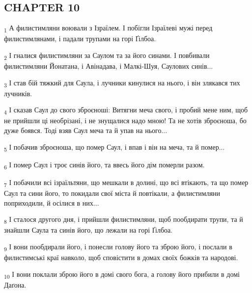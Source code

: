 \subsection{CHAPTER 10}
\begin{tcolorbox}
\textsubscript{1} А филистимляни воювали з Ізраїлем. І побігли Ізраїлеві мужі перед филистимлянами, і падали трупами на горі Ґілбоа.
\end{tcolorbox}
\begin{tcolorbox}
\textsubscript{2} І гналися филистимляни за Саулом та за його синами. І повбивали филистимляни Йонатана, і Авінадава, і Малкі-Шуя, Саулових синів...
\end{tcolorbox}
\begin{tcolorbox}
\textsubscript{3} І став бій тяжкий для Саула, і лучники кинулися на нього, і він злякався тих лучників.
\end{tcolorbox}
\begin{tcolorbox}
\textsubscript{4} І сказав Саул до свого зброєноші: Витягни меча свого, і пробий мене ним, щоб не прийшли ці необрізані, і не знущалися надо мною! Та не хотів зброєноша, бо дуже боявся. Тоді взяв Саул меча та й упав на нього...
\end{tcolorbox}
\begin{tcolorbox}
\textsubscript{5} І побачив зброєноша, що помер Саул, і впав і він на меча, та й помер...
\end{tcolorbox}
\begin{tcolorbox}
\textsubscript{6} І помер Саул і троє синів його, та ввесь його дім померли разом.
\end{tcolorbox}
\begin{tcolorbox}
\textsubscript{7} І побачили всі ізраїльтяни, що мешкали в долині, що всі втікають, та що помер Саул та сини його, то покидали свої міста й повтікали, а филистимляни поприходили, й осілися в них...
\end{tcolorbox}
\begin{tcolorbox}
\textsubscript{8} І сталося другого дня, і прийшли филистимляни, щоб пообдирати трупи, та й знайшли Саула та синів його, що лежали на горі Ґілбоа.
\end{tcolorbox}
\begin{tcolorbox}
\textsubscript{9} І вони пообдирали його, і понесли голову його та зброю його, і послали в филистимські краї навколо, щоб сповістити в домах своїх божків та народові.
\end{tcolorbox}
\begin{tcolorbox}
\textsubscript{10} І вони поклали зброю його в домі свого бога, а голову його прибили в домі Даґона.
\end{tcolorbox}
